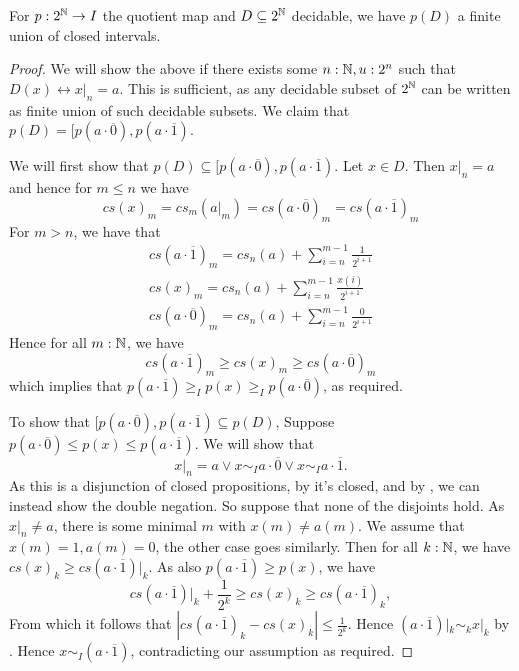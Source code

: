 \begin{lemma}
  For $p:2^{\mathbb{N}} \to I$ the quotient map and $D\subseteq 2^{\mathbb{N}}$ decidable, we have $p(D)$ a finite union of closed intervals. 
\end{lemma}
\begin{proof}
  We will show the above if there exists some $n:\mathbb{N}, u:2^n$ such that $D(x) \leftrightarrow x|_n = a$.
  This is sufficient, as any decidable subset of $2^{\mathbb{N}}$ can be written as finite union of such decidable subsets. 
  We claim that $p(D) = [p(a\cdot \overline 0) , p(a \cdot \overline 1)$. 
\item 
  We will first show that $p(D) \subseteq [p(a\cdot \overline 0) , p(a \cdot \overline 1)$. 
  Let $x\in D$. 
  Then $x|_n = a$ and hence for $m\leq n$ we have 
  \begin{equation}
    cs(x)_m = cs_m(a|_m) = cs(a\cdot \overline 0)_m= cs(a\cdot \overline 1)_m
  \end{equation}
  For $m>n$, we have that 
  \begin{align}
    cs(a\cdot \overline 1)_m =
    cs_n(a) +\sum_{i = n} ^{m-1} \frac{1}{2^{i+1}}
    \\
    cs(x)_m =
    cs_n(a) +\sum_{i = n} ^{m-1} \frac{x(i)}{2^{i+1}}
    \\
    cs(a\cdot \overline 0)_m = 
    cs_n(a) +\sum_{i = n} ^{m-1} \frac{0}{2^{i+1}}
  \end{align} 
  Hence for all $m:\mathbb{N}$, we have 
  \begin{equation}
    cs(a\cdot \overline 1)_m \geq 
    cs(x)_m \geq 
    cs(a\cdot\overline 0)_m
  \end{equation}
 which implies that $p(a\cdot \overline 1) \geq_I p(x) \geq_I p(a\cdot\overline 0)$, as required. 
\item 
  To show that $[p(a\cdot \overline 0) , p(a \cdot \overline 1)\subseteq p(D)$, 
  Suppose
  $p(a\cdot \overline 0) \leq p(x) \leq p(a \cdot \overline 1)$. 
  We will show that 
  $$x|_n = a \vee x \sim_I a \cdot \overline 0 \vee x \sim_I a \cdot \overline 1.$$
  As this is a disjunction of closed propositions, by  it's closed, and by 
  , we can instead show the double negation. 
  So suppose that none of the disjoints hold. 
  As $x|_n \neq a$, there is some minimal $m$ with $x(m) \neq a(m)$. 
  We assume that $x(m) = 1, a(m) = 0$, the other case goes similarly. 
  Then for all $k:\mathbb{N}$, we have 
  $cs(x)_k \geq cs(a \cdot \overline 1)|_k$. 
  As also 
  $p(a\cdot \overline 1)\geq p(x)$, we have 
  $$cs(a \cdot \overline 1)|_k + \frac{1}{2^k} \geq cs(x)_k \geq cs(a\cdot \overline 1)_k,$$
  From which it follows that $|cs(a\cdot\overline 1)_k - cs(x)_k|\leq \frac{1}{2^k}$. 
  Hence $(a\cdot \overline 1)|_k \sim_k x|_k$ by . 
  Hence $x\sim_I (a\cdot\overline 1)$, contradicting our assumption as required. 
\end{proof}

